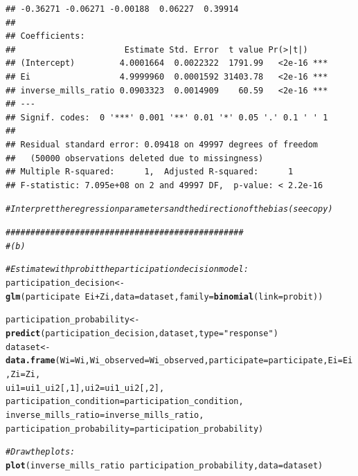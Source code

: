 \documentclass{article}\usepackage[]{graphicx}\usepackage[]{xcolor}
\makeatletter
\newcommand{\hlnum}[1]{\textcolor[rgb]{0.686,0.059,0.569}{#1}}%
\newcommand{\hlsng}[1]{\textcolor[rgb]{0.192,0.494,0.8}{#1}}%
\newcommand{\hlcom}[1]{\textcolor[rgb]{0.678,0.584,0.686}{\textit{#1}}}%
\newcommand{\hlopt}[1]{\textcolor[rgb]{0,0,0}{#1}}%
\newcommand{\hldef}[1]{\textcolor[rgb]{0.345,0.345,0.345}{#1}}%
\newcommand{\hlkwb}[1]{\textcolor[rgb]{0.69,0.353,0.396}{#1}}%
\newcommand{\hlkwc}[1]{\textcolor[rgb]{0.333,0.667,0.333}{#1}}%
\newcommand{\hlkwd}[1]{\textcolor[rgb]{0.737,0.353,0.396}{\textbf{#1}}}%
\newenvironment{kframe}{%
 \def\at@end@of@kframe{}%
 \ifinner\ifhmode%
  \def\at@end@of@kframe{\end{minipage}}%
  \begin{minipage}{\columnwidth}%
 \fi\fi%
 \def\FrameCommand##1{\hskip\@totalleftmargin \hskip-\fboxsep
 \colorbox{shadecolor}{##1}\hskip-\fboxsep
     \hskip-\linewidth \hskip-\@totalleftmargin \hskip\columnwidth}%
 \MakeFramed {\advance\hsize-\width
   \@totalleftmargin\z@ \linewidth\hsize
   \@setminipage}}%
 {\par\unskip\endMakeFramed%
 \at@end@of@kframe}
\newenvironment{knitrout}{}{} %
\makeatother
\begin{document}
\begin{knitrout}
\begin{kframe}
\begin{verbatim}
## -0.36271 -0.06271 -0.00188  0.06227  0.39914 
## 
## Coefficients:
##                      Estimate Std. Error  t value Pr(>|t|)    
## (Intercept)         4.0001664  0.0022322  1791.99   <2e-16 ***
## Ei                  4.9999960  0.0001592 31403.78   <2e-16 ***
## inverse_mills_ratio 0.0903323  0.0014909    60.59   <2e-16 ***
## ---
## Signif. codes:  0 '***' 0.001 '**' 0.01 '*' 0.05 '.' 0.1 ' ' 1
## 
## Residual standard error: 0.09418 on 49997 degrees of freedom
##   (50000 observations deleted due to missingness)
## Multiple R-squared:      1,	Adjusted R-squared:      1 
## F-statistic: 7.095e+08 on 2 and 49997 DF,  p-value: < 2.2e-16
\end{verbatim}
\begin{alltt}
\hlcom{# Interpret the regression parameters and the direction of the bias (see copy)}

\hlcom{################################################}
\hlcom{# (b)}

\hlcom{# Estimate with probit the participation decision model:}
\hldef{participation_decision} \hlkwb{<-} \hlkwd{glm}\hldef{(participate}\hlopt{~}\hldef{Ei}\hlopt{+}\hldef{Zi,}\hlkwc{data} \hldef{= dataset,}\hlkwc{family} \hldef{=} \hlkwd{binomial}\hldef{(}\hlkwc{link} \hldef{= probit))}
\end{alltt}


{\ttfamily\noindent\color{warningcolor}{\#\# Warning: glm.fit: fitted probabilities numerically 0 or 1 occurred}}\begin{alltt}
\hldef{participation_probability} \hlkwb{<-} \hlkwd{predict}\hldef{(participation_decision,dataset,}\hlkwc{type}\hldef{=}\hlsng{"response"}\hldef{)}
\hldef{dataset} \hlkwb{<-} \hlkwd{data.frame}\hldef{(}\hlkwc{Wi}\hldef{=Wi,}\hlkwc{Wi_observed}\hldef{=Wi_observed,}\hlkwc{participate}\hldef{=participate,}\hlkwc{Ei}\hldef{=Ei,}\hlkwc{Zi}\hldef{=Zi,}
                      \hlkwc{ui1}\hldef{=ui1_ui2[,}\hlnum{1}\hldef{],}\hlkwc{ui2}\hldef{=ui1_ui2[,}\hlnum{2}\hldef{],}
                      \hlkwc{participation_condition}\hldef{=participation_condition,}
                      \hlkwc{inverse_mills_ratio}\hldef{=inverse_mills_ratio,}
                      \hlkwc{participation_probability}\hldef{=participation_probability)}

\hlcom{# Draw the plots:}
\hlkwd{plot}\hldef{(inverse_mills_ratio}\hlopt{~}\hldef{participation_probability,} \hlkwc{data}\hldef{=dataset)}
\end{alltt}
\end{kframe}


\end{knitrout}
\end{document}
